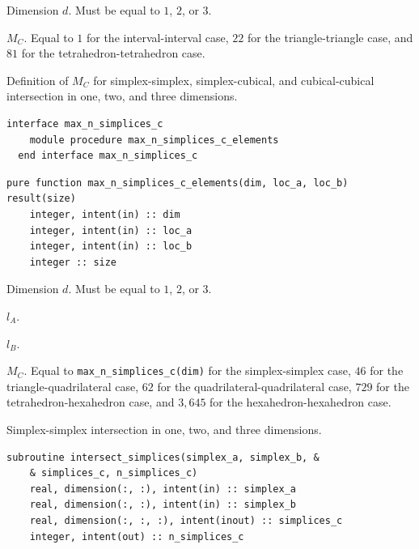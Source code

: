 \documentclass{article}
\begin{document}
\begin{description}[font=\ttfamily\bfseries,leftmargin=2.2\parindent,labelindent=1.7\parindent,noitemsep]
  \item[dim] Dimension $d$. Must be equal to $1$, $2$, or $3$.
  \item[size] $M_C$. Equal to $1$ for the interval-interval case, $22$ for the
    triangle-triangle case, and $81$ for the tetrahedron-tetrahedron case.
\end{description}

\noindent Definition of $M_C$ for simplex-simplex, simplex-cubical, and
cubical-cubical intersection in one, two, and three dimensions.
  
\begin{lstlisting}[language=FORTRAN]
  interface max_n_simplices_c
    module procedure max_n_simplices_c_elements
  end interface max_n_simplices_c
\end{lstlisting}

\begin{lstlisting}[language=FORTRAN]
  pure function max_n_simplices_c_elements(dim, loc_a, loc_b) result(size)
    integer, intent(in) :: dim
    integer, intent(in) :: loc_a
    integer, intent(in) :: loc_b
    integer :: size
\end{lstlisting}

\begin{description}[font=\ttfamily\bfseries,leftmargin=2.2\parindent,labelindent=1.7\parindent,noitemsep]
  \item[dim] Dimension $d$. Must be equal to $1$, $2$, or $3$.
  \item[loc\_a] $l_A$.
  \item[loc\_b] $l_B$.
  \item[size] $M_C$. Equal to \verb+max_n_simplices_c(dim)+ for the
    simplex-simplex case, $46$ for the \linebreak triangle-quadrilateral case,
    $62$ for the quadrilateral-quadrilateral case, $729$ for the \linebreak
    tetrahedron-hexahedron case, and $3,645$ for the hexahedron-hexahedron case.
\end{description}

\noindent Simplex-simplex intersection in one, two, and three dimensions.

\begin{lstlisting}[language=FORTRAN]
  subroutine intersect_simplices(simplex_a, simplex_b, &
    & simplices_c, n_simplices_c)
    real, dimension(:, :), intent(in) :: simplex_a
    real, dimension(:, :), intent(in) :: simplex_b
    real, dimension(:, :, :), intent(inout) :: simplices_c
    integer, intent(out) :: n_simplices_c
\end{lstlisting}
\end{document}

